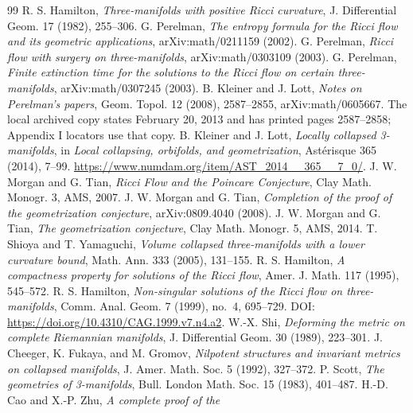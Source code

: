 \documentclass[10pt]{amsbook}
\numberwithin{section}{chapter}
\numberwithin{equation}{chapter}
\begin{document}


\backmatter
\begin{thebibliography}{99}
 R. S. Hamilton, \emph{Three-manifolds with positive
Ricci curvature}, J. Differential Geom. 17 (1982), 255--306.
 G. Perelman, \emph{The entropy formula for the Ricci
flow and its geometric applications}, arXiv:math/0211159 (2002).
 G. Perelman, \emph{Ricci flow with surgery on
three-manifolds}, arXiv:math/0303109 (2003).
 G. Perelman, \emph{Finite extinction time
for the solutions to the Ricci flow on certain three-manifolds},
arXiv:math/0307245 (2003).
 B. Kleiner and J. Lott, \emph{Notes on Perelman's
papers}, Geom. Topol. 12 (2008), 2587--2855, arXiv:math/0605667. The local archived copy states February 20,
2013 and has printed pages 2587--2858; Appendix I locators use that copy.
 B. Kleiner and J. Lott, \emph{Locally
collapsed 3-manifolds}, in \emph{Local collapsing, orbifolds, and
geometrization}, Ast\'erisque 365 (2014), 7--99.
\url{https://www.numdam.org/item/AST_2014__365__7_0/}.
 J. W. Morgan and G. Tian, \emph{Ricci Flow and the
Poincare Conjecture}, Clay Math. Monogr. 3, AMS, 2007.
 J. W. Morgan and G. Tian, \emph{Completion of the
proof of the geometrization conjecture}, arXiv:0809.4040 (2008).
 J. W. Morgan and G. Tian, \emph{The geometrization
conjecture}, Clay Math. Monogr. 5, AMS, 2014.
 T. Shioya and T. Yamaguchi, \emph{Volume
collapsed three-manifolds with a lower curvature bound}, Math. Ann. 333
(2005), 131--155.
 R. S. Hamilton, \emph{A compactness property for
solutions of the Ricci flow}, Amer. J. Math. 117 (1995), 545--572.
 R. S. Hamilton, \emph{Non-singular solutions of the
Ricci flow on three-manifolds}, Comm. Anal. Geom. 7 (1999), no.~4, 695--729.
DOI: \url{https://doi.org/10.4310/CAG.1999.v7.n4.a2}.
 W.-X. Shi, \emph{Deforming the metric on complete
Riemannian manifolds}, J. Differential Geom. 30 (1989), 223--301.
 J. Cheeger, K. Fukaya, and M. Gromov,
\emph{Nilpotent structures and invariant metrics on collapsed manifolds},
J. Amer. Math. Soc. 5 (1992), 327--372.
 P. Scott, \emph{The geometries of 3-manifolds}, Bull.
London Math. Soc. 15 (1983), 401--487.
 H.-D. Cao and X.-P. Zhu, \emph{A complete proof of the
}
\end{thebibliography}
\end{document}
